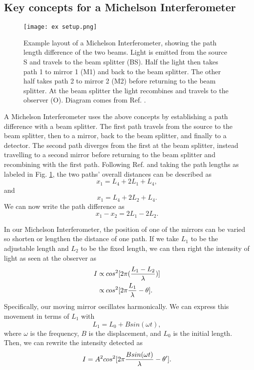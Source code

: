 \documentclass[11pt,letterpaper]{article}
\begin{document}
\subsection{Key concepts for a Michelson Interferometer}

\begin{figure}
\centerline{\texttt{[image: ex setup.png]}}
\caption{Example layout of a Michelson Interferometer, showing the path length difference of the two beams. Light is emitted from the source S and travels to the beam splitter (BS). Half the light then takes path 1 to mirror 1 (M1) and back to the beam splitter. The other half takes path 2 to mirror 2 (M2) before returning to the beam splitter. At the beam splitter the light recombines and travels to the observer (O). Diagram comes from Ref. \cite{Michelson}.} \label{ex setup}
\end{figure}

A Michelson Interferometer uses the above concepts by establishing a path difference with a beam splitter. The first path travels from the source to the beam splitter, then to a mirror, back to the beam splitter, and finally to a detector. The second path diverges from the first at the beam splitter, instead travelling to a second mirror before returning to the beam splitter and recombining with the first path. Following Ref. \cite{Michelson} and taking the path lengths as labeled in Fig. \ref{ex setup}, the two paths' overall distances can be described as
\begin{equation}
    x_1 = L_4 + 2 L_1 + L_4 ,
\end{equation}
and
\begin{equation}
    x_1 = L_4 + 2 L_2 + L_4 .
\end{equation}
We can now write the path difference as
\begin{equation}
    x_1 - x_2 = 2L_1 - 2L_2 .
\end{equation}

In our Michelson Interferometer, the position of one of the mirrors can be varied so shorten or lengthen the distance of one path. If we take $L_1$ to be the adjustable length and $L_2$ to be the fixed length, we can then right the intensity of light as seen at the observer as
\begin{align}
    I \propto & \: cos^2 [2 \pi ( {L_1 - L_2 \over \lambda } ) ] \\
    \propto & \: cos^2 [2 \pi {L_1 \over \lambda } - \theta] .
\end{align}
Specifically, our moving mirror oscillates harmonically. We can express this movement in terms of $L_1$ with
\begin{equation}
    L_1 = L_0 + B sin(\omega t),
\end{equation}
where $\omega$ is the frequency, $B$ is the displacement, and $L_0$ is the initial length. Then, we can rewrite the intensity detected as
\begin{equation}
    I = A^2 cos^2 [2\pi {B sin(\omega t) \over \lambda } - \theta '] .
\end{equation}
\end{document}
